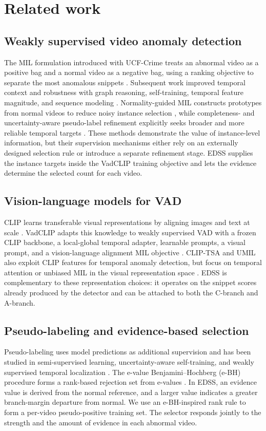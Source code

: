 \documentclass[preprint,12pt]{elsarticle}
\begin{document}
\section{Related work}
\label{sec:related}

\subsection{Weakly supervised video anomaly detection}
The MIL formulation introduced with UCF-Crime treats an abnormal video as a positive bag and a normal video as a negative bag, using a ranking objective to separate the most anomalous snippets \citep{sultani2018}. Subsequent work improved temporal context and robustness with graph reasoning, self-training, temporal feature magnitude, and sequence modeling \citep{gcn2019,rtfm2021,mist2021,msl2022}. Normality-guided MIL constructs prototypes from normal videos to reduce noisy instance selection \citep{ngmil2023}, while completeness- and uncertainty-aware pseudo-label refinement explicitly seeks broader and more reliable temporal targets \citep{cupl2023}. These methods demonstrate the value of instance-level information, but their supervision mechanisms either rely on an externally designed selection rule or introduce a separate refinement stage. EDSS supplies the instance targets inside the VadCLIP training objective and lets the evidence determine the selected count for each video.

\subsection{Vision-language models for VAD}
CLIP learns transferable visual representations by aligning images and text at scale \citep{clip2021}. VadCLIP adapts this knowledge to weakly supervised VAD with a frozen CLIP backbone, a local-global temporal adapter, learnable prompts, a visual prompt, and a vision-language alignment MIL objective \citep{vadclip2024}. CLIP-TSA and UMIL also exploit CLIP features for temporal anomaly detection, but focus on temporal attention or unbiased MIL in the visual representation space \citep{cliptsa2023,umil2023}. EDSS is complementary to these representation choices: it operates on the snippet scores already produced by the detector and can be attached to both the C-branch and A-branch.

\subsection{Pseudo-labeling and evidence-based selection}
Pseudo-labeling uses model predictions as additional supervision and has been studied in semi-supervised learning, uncertainty-aware self-training, and weakly supervised temporal localization \citep{pseudolabel2013,uncertaintypseudolabel2021}. The e-value Benjamini--Hochberg (e-BH) procedure forms a rank-based rejection set from e-values \citep{wangramdas2022}. In EDSS, an evidence value is derived from the normal reference, and a larger value indicates a greater branch-margin departure from normal. We use an e-BH-inspired rank rule to form a per-video pseudo-positive training set. The selector responds jointly to the strength and the amount of evidence in each abnormal video.
\end{document}
